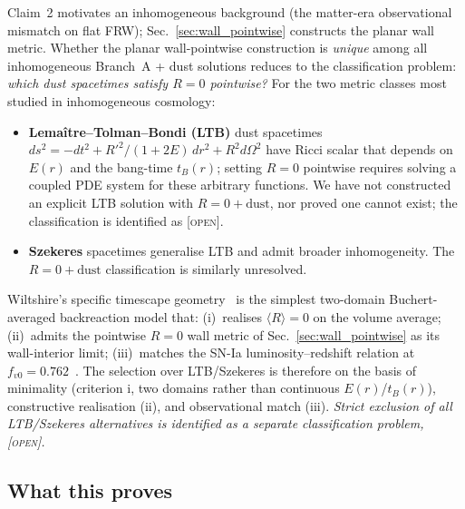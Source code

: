 \documentclass[aps,prd,twocolumn,nofootinbib,floatfix,superscriptaddress]{revtex4-2}
\newcommand{\OPEN}{{\color{black!60!red}\textsc{[open]}}}
\begin{document}
Claim~2 motivates an inhomogeneous background (the
matter-era observational mismatch on flat FRW);
Sec.~\ref{sec:wall_pointwise}
constructs the planar wall metric. Whether the planar
wall-pointwise construction is \emph{unique} among all
inhomogeneous Branch~A + dust solutions reduces to the
classification problem: \emph{which dust spacetimes satisfy
$R = 0$ pointwise?} For the two metric classes most studied in
inhomogeneous cosmology:
\begin{itemize}
\item \textbf{Lema\^itre--Tolman--Bondi (LTB)} dust spacetimes
$ds^2 = -dt^2 + R'^2/(1+2E)\,dr^2 + R^2 d\Omega^2$ have Ricci
scalar that depends on $E(r)$ and the bang-time $t_B(r)$; setting
$R = 0$ pointwise requires solving a coupled PDE system for these
arbitrary functions. We have not constructed an explicit LTB
solution with $R = 0 + \text{dust}$, nor proved one cannot exist;
the classification is identified as \OPEN.
\item \textbf{Szekeres} spacetimes generalise LTB and admit broader
inhomogeneity. The $R = 0 + \text{dust}$ classification is similarly
unresolved.
\end{itemize}
Wiltshire's specific timescape geometry~\cite{Wiltshire2007,Wiltshire2009}
is the simplest two-domain Buchert-averaged backreaction model
that:
(i)~realises $\langle R\rangle = 0$ on the volume average;
(ii)~admits the pointwise $R = 0$ wall metric of
Sec.~\ref{sec:wall_pointwise} as its wall-interior limit;
(iii)~matches the SN-Ia luminosity--redshift relation at
$f_{v0} = 0.762$~\cite{Dam2017,Wiltshire2009}.
The selection over LTB/Szekeres is therefore on the basis of
minimality (criterion i, two domains rather than continuous
$E(r)$/$t_B(r)$), constructive realisation (ii), and observational
match (iii). \emph{Strict exclusion of all LTB/Szekeres alternatives
is identified as a separate classification problem,
\OPEN.}

\subsection{What this proves}
\end{document}
